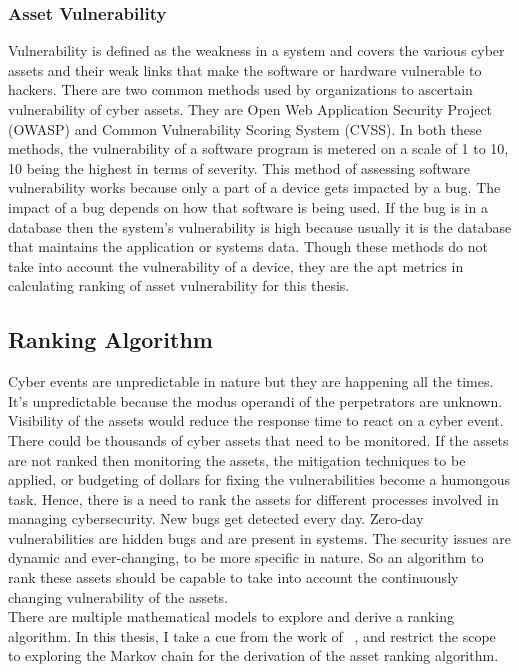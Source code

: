 \subsubsection{Asset Vulnerability}\label{sec:asset_vulner}
Vulnerability is defined as the weakness in a system and covers the various cyber assets and their weak links that make the software or hardware vulnerable to hackers. There are two common methods used by organizations to ascertain vulnerability of cyber assets. They are Open Web Application Security Project (OWASP) and Common Vulnerability Scoring System (CVSS). In both these methods, the vulnerability of a software program is metered on a scale of 1 to 10, 10 being the highest in terms of severity. This method of assessing software vulnerability works because only a part of a device gets impacted by a bug. The impact of a bug depends on how that software is being used. If the bug is in a database then the system's vulnerability is high because usually it is the database that maintains the application or systems data. Though these methods do not take into account the vulnerability of a device, they are the apt metrics in calculating ranking of asset vulnerability for this thesis.

\subsection{Ranking Algorithm}\label{sec:ranking}
Cyber events are unpredictable in nature but they are happening all the times. It's unpredictable because the modus operandi of the perpetrators are unknown. Visibility of the assets would reduce the response time to react on a cyber event. There could be thousands of cyber assets that need to be monitored. If the assets are not ranked then monitoring the assets, the mitigation techniques to be applied, or budgeting of dollars for fixing the vulnerabilities become a humongous task. Hence, there is a need to rank the assets for different processes involved in managing cybersecurity.
New bugs get detected every day. Zero-day vulnerabilities are hidden bugs and are present in systems. The security issues are dynamic and ever-changing, to be more specific  in nature. So an algorithm to rank these assets should be capable to take into account the continuously changing vulnerability of the assets. \\
There are multiple mathematical models to explore and derive a ranking algorithm. In this thesis, I take a cue from the work of ~\cite{Pageetal98}, and restrict the scope to exploring the Markov chain for the derivation of the asset ranking algorithm.

